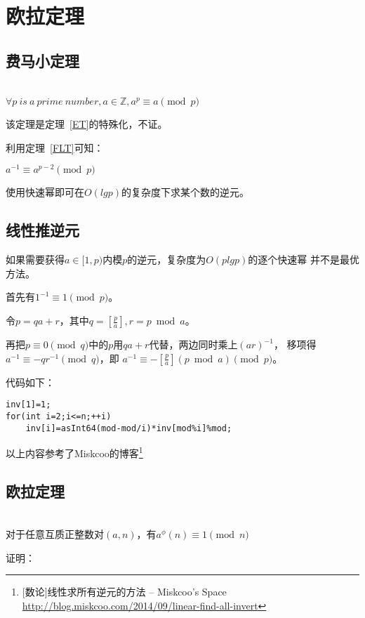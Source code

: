\section{欧拉定理}
\subsection{费马小定理}
\begin{theorem}\label{FLT}
	~\\
	$\forall p~is~a~prime~number,a\in \mathbb{Z},a^p \equiv a \pmod{p}$
\end{theorem}

该定理是定理~\ref{ET}的特殊化，不证。

利用定理~\ref{FLT}可知：

\begin{inference}
	$a^{-1} \equiv a^{p-2} \pmod{p}$
\end{inference}

使用快速幂即可在$O(lgp)$的复杂度下求某个数的逆元。

\subsection{线性推逆元}

如果需要获得$a\in [1,p)$内模$p$的逆元，复杂度为$O(plgp)$的逐个快速幂
并不是最优方法。

首先有$1^{-1}\equiv 1 \pmod{p}$。

令$p=qa+r$，其中$q=[\frac{p}{a}],r=p \bmod a$。

再把$p \equiv 0 \pmod{q}$中的$p$用$qa+r$代替，两边同时乘上$(ar)^{-1}$，
移项得$a^{-1}\equiv -qr^{-1} \pmod{q}$，即
$a^{-1}\equiv -[\frac{p}{a}](p \bmod a) \pmod{p}$。

代码如下：
\begin{lstlisting}[title=inv]
inv[1]=1;
for(int i=2;i<=n;++i)
    inv[i]=asInt64(mod-mod/i)*inv[mod%i]%mod;
\end{lstlisting}

以上内容参考了Miskcoo的博客\footnote{[数论]线性求所有逆元的方法 – Miskcoo's Space
	\url{http://blog.miskcoo.com/2014/09/linear-find-all-invert}}

\subsection{欧拉定理}
\begin{theorem}\label{ET}
	~\\
	对于任意互质正整数对$(a,n)$，有$a^\phi(n) \equiv 1 \pmod{n}$
\end{theorem}
证明：

